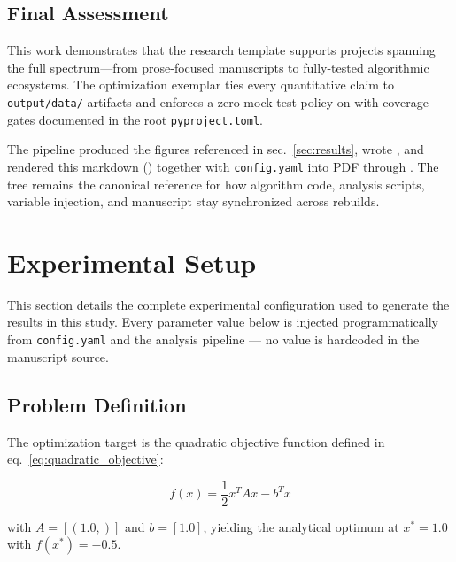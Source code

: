 \documentclass[
]{article}
\begin{document}
\subsection{Final Assessment}\label{final-assessment}

This work demonstrates that the research template supports projects
spanning the full spectrum---from prose-focused manuscripts to
fully-tested algorithmic ecosystems. The optimization exemplar ties
every quantitative claim to \texttt{output/data/} artifacts and enforces
a zero-mock test policy on
 with coverage gates
documented in the root \texttt{pyproject.toml}.

The pipeline produced the figures referenced in sec.~\ref{sec:results},
wrote , and rendered this markdown
()
together with \texttt{config.yaml} into PDF through
. The 
tree remains the canonical reference for how algorithm code, analysis
scripts, variable injection, and manuscript stay synchronized across
rebuilds.

\newpage

\section{Experimental Setup}\label{sec:experimental_setup}

This section details the complete experimental configuration used to
generate the results in this study. Every parameter value below is
injected programmatically from \texttt{config.yaml} and the analysis
pipeline --- no value is hardcoded in the manuscript source.

\subsection{Problem Definition}\label{problem-definition}

The optimization target is the quadratic objective function defined in
eq.~\ref{eq:quadratic_objective}:

\begin{equation}
\label{eq:quadratic_objective}
f(x) = \frac{1}{2} x^T A x - b^T x
\end{equation}

with \(A = [(1.0,)]\) and \(b = [1.0]\), yielding the analytical optimum
at \(x^* = 1.0\) with \(f(x^*) = -0.5\).
\end{document}
